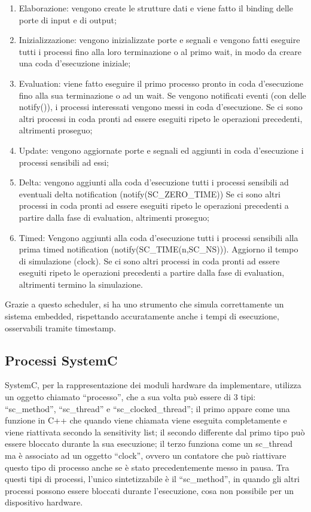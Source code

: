 \documentclass[a4paper,titlepage]{book}
\begin{document}
\begin{enumerate}
\item Elaborazione: vengono create le strutture dati e viene fatto il binding delle porte di input e di output;
\item Inizializzazione: vengono inizializzate porte e segnali e vengono fatti eseguire tutti i processi fino alla loro terminazione o al primo wait, in modo da creare una coda d'esecuzione iniziale;
\item Evaluation: viene fatto eseguire il primo processo pronto in coda d'esecuzione fino alla sua terminazione o ad un wait. Se vengono notificati eventi (con delle notify()), i processi interessati vengono messi in coda d'esecuzione. Se ci sono altri processi in coda pronti ad essere eseguiti ripeto le operazioni precedenti, altrimenti proseguo;
\item Update: vengono aggiornate porte e segnali ed aggiunti in coda d'esecuzione i processi sensibili ad essi;
\item Delta: vengono aggiunti alla coda d'esecuzione tutti i processi sensibili ad eventuali delta notification (notify(SC\_ZERO\_TIME)) Se ci sono altri processi in coda pronti ad essere eseguiti ripeto le operazioni precedenti a partire dalla fase di evaluation, altrimenti proseguo;
\item Timed: Vengono aggiunti alla coda d'esecuzione tutti i processi sensibili alla prima timed notification (notify(SC\_TIME(n,SC\_NS))). Aggiorno il tempo di simulazione (clock). Se ci sono altri processi in coda pronti ad essere eseguiti ripeto le operazioni precedenti a partire dalla fase di evaluation, altrimenti termino la simulazione.
\end{enumerate}

Grazie a questo scheduler, si ha uno strumento che simula correttamente un sistema embedded, rispettando accuratamente anche i tempi di esecuzione, osservabili tramite timestamp.

\subsection{Processi SystemC}

SystemC, per la rappresentazione dei moduli hardware da implementare, utilizza un oggetto chiamato ``processo'', che a sua volta può essere di 3 tipi: ``sc\_method'', ``sc\_thread'' e ``sc\_clocked\_thread''; il primo appare come una funzione in C++ che quando viene chiamata viene eseguita completamente e viene riattivata secondo la sensitivity list; il secondo differente dal primo tipo può essere bloccato durante la sua esecuzione; il terzo funziona come un sc\_thread ma è associato ad un oggetto ``clock'', ovvero un contatore che può riattivare questo tipo di processo anche se è stato precedentemente messo in pausa. Tra questi tipi di processi, l'unico sintetizzabile è il ``sc\_method'', in quando gli altri processi possono essere bloccati durante l'esecuzione, cosa non possibile per un dispositivo hardware. 
\end{document}
